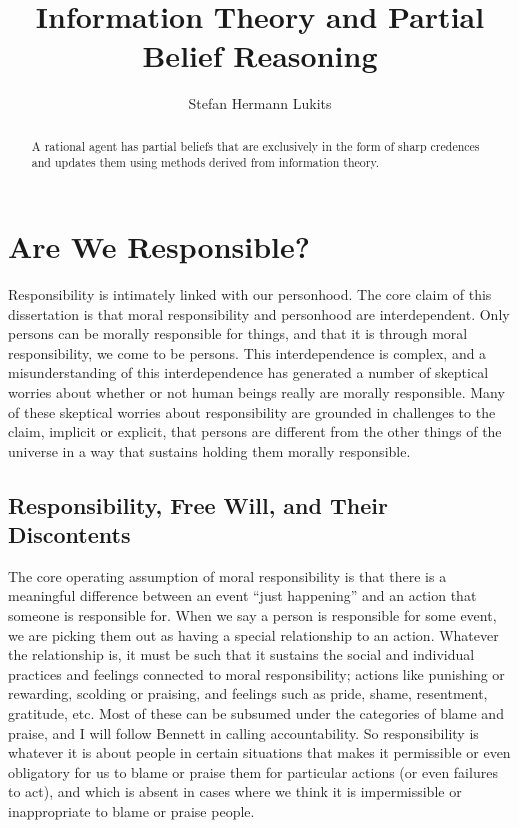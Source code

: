 \documentclass[phd,12pt,oneside,paper=letterpaper]{ubcthesis}
\title{Information Theory and Partial Belief Reasoning}
\author{Stefan Hermann Lukits}
\begin{document}
\frontmatter
\maketitle
\begin{abstract}
A rational agent has partial beliefs that are exclusively in the form
of sharp credences and updates them using methods derived from
information theory.
\end{abstract}
\tableofcontents


\mainmatter
\chapter{Are We Responsible?}
Responsibility is intimately linked with our personhood. The core claim of this dissertation is that moral responsibility and personhood are interdependent. Only persons can be morally responsible for things, and that it is through moral responsibility, we come to be persons. This interdependence is complex, and a misunderstanding of this interdependence has generated a number of skeptical worries about whether or not human beings really are morally responsible. Many of these skeptical worries about responsibility are grounded in challenges to the claim, implicit or explicit, that persons are different from the other things of the universe in a way that sustains holding them morally responsible. 
\section{Responsibility, Free Will, and Their Discontents}
The core operating assumption of moral responsibility is that there is a meaningful difference between an event ``just happening'' and an action that someone is responsible for.  When we say a person is responsible for some event, we are picking them out as having a special relationship to an action. Whatever the relationship is, it must be such that it sustains the social and individual practices and feelings connected to moral responsibility; actions like punishing or rewarding, scolding or praising, and feelings such as pride, shame, resentment, gratitude, etc. Most of these can be subsumed under the categories of blame and praise, and I will follow Bennett \citeyearpar{bennett1980} in calling accountability. So responsibility is whatever it is about people in certain situations that makes it permissible or even obligatory for us to blame or praise them for particular actions (or even failures to act), and which is absent in cases where we think it is impermissible or inappropriate to blame or praise people.
\end{document}
